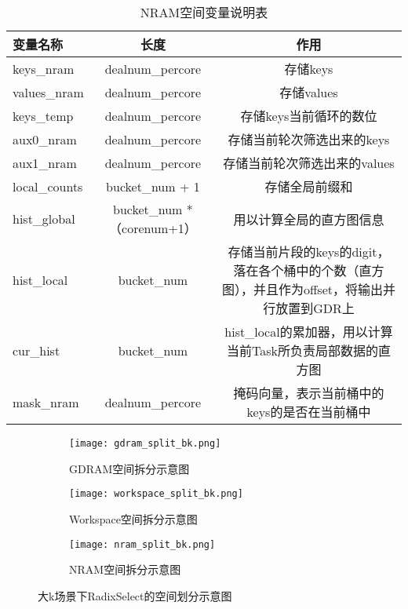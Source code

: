 \begin{table}
    \caption{NRAM空间变量说明表}
    \centering
    \begin{tabular}{lcc}
    \toprule
    变量名称 & 长度 & 作用 \\
    \midrule
    keys\_nram & dealnum\_percore & 存储keys \\
    values\_nram & dealnum\_percore & 存储values \\
    keys\_temp & dealnum\_percore & 存储keys当前循环的数位 \\
    aux0\_nram & dealnum\_percore & 存储当前轮次筛选出来的keys \\
    aux1\_nram & dealnum\_percore &  存储当前轮次筛选出来的values\\
    local\_counts & bucket\_num + 1 & 存储全局前缀和 \\
    hist\_global & bucket\_num * （corenum+1） & 用以计算全局的直方图信息 \\
    hist\_local & bucket\_num & \parbox{8cm}{存储当前片段的keys的digit，落在各个桶中的个数（直方图），并且作为offset，将输出并行放置到GDR上} \\
    cur\_hist & bucket\_num & \parbox{8cm}{hist\_local的累加器，用以计算当前Task所负责局部数据的直方图} \\
    mask\_nram & dealnum\_percore & 掩码向量，表示当前桶中的keys的是否在当前桶中 \\
    \bottomrule
    \end{tabular}
    \label{tab:nram_var_bk}
\end{table}
\begin{figure}[htbp]
    \centering
    \begin{subfigure}[b]{\textwidth}
        \centering
        \texttt{[image: gdram\_split\_bk.png]}
        \caption{GDRAM空间拆分示意图}
        \label{fig:gdram_split_bk}
    \end{subfigure}
    
    \vspace{1em} %

    \begin{subfigure}[b]{\textwidth}
        \centering
        \texttt{[image: workspace\_split\_bk.png]}
    \caption{Workspace空间拆分示意图}
    \label{fig:workspace_split_bk}
    \end{subfigure}
    
    \begin{subfigure}[c]{\textwidth}
        \centering
        \texttt{[image: nram\_split\_bk.png]}
    \caption{NRAM空间拆分示意图}
    \label{fig:nram_split_bk}
    \end{subfigure}
    \caption{大k场景下RadixSelect的空间划分示意图}
    \label{fig:images}
\end{figure}




